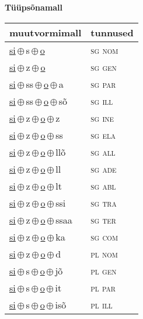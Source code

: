 

\vspace{3.5em}
\noindent \begin{minipage}{\textwidth}
\noindent \textbf{Tüüpsõnamall \,}\\

\begin{sideways}
\begin{tabular}{l l}
muutvormimall & tunnused \\
\hline
\underline{si}\,$\oplus$\,s\,$\oplus$\,\underline{o} & \textsc{ sg nom } \\
\underline{si}\,$\oplus$\,z\,$\oplus$\,\underline{o} & \textsc{ sg gen } \\
\underline{si}\,$\oplus$\,ss\,$\oplus$\,\underline{o}\,$\oplus$\,a & \textsc{ sg par } \\
\underline{si}\,$\oplus$\,ss\,$\oplus$\,\underline{o}\,$\oplus$\,sõ & \textsc{ sg ill } \\
\underline{si}\,$\oplus$\,z\,$\oplus$\,\underline{o}\,$\oplus$\,z & \textsc{ sg ine } \\
\underline{si}\,$\oplus$\,z\,$\oplus$\,\underline{o}\,$\oplus$\,ss & \textsc{ sg ela } \\
\underline{si}\,$\oplus$\,z\,$\oplus$\,\underline{o}\,$\oplus$\,llõ & \textsc{ sg all } \\
\underline{si}\,$\oplus$\,z\,$\oplus$\,\underline{o}\,$\oplus$\,ll & \textsc{ sg ade } \\
\underline{si}\,$\oplus$\,z\,$\oplus$\,\underline{o}\,$\oplus$\,lt & \textsc{ sg abl } \\
\underline{si}\,$\oplus$\,z\,$\oplus$\,\underline{o}\,$\oplus$\,ssi & \textsc{ sg tra } \\
\underline{si}\,$\oplus$\,z\,$\oplus$\,\underline{o}\,$\oplus$\,ssaa & \textsc{ sg ter } \\
\underline{si}\,$\oplus$\,z\,$\oplus$\,\underline{o}\,$\oplus$\,ka & \textsc{ sg com } \\
\underline{si}\,$\oplus$\,z\,$\oplus$\,\underline{o}\,$\oplus$\,d & \textsc{ pl nom } \\
\underline{si}\,$\oplus$\,s\,$\oplus$\,\underline{o}\,$\oplus$\,jõ & \textsc{ pl gen } \\
\underline{si}\,$\oplus$\,s\,$\oplus$\,\underline{o}\,$\oplus$\,it & \textsc{ pl par } \\
\underline{si}\,$\oplus$\,s\,$\oplus$\,\underline{o}\,$\oplus$\,isõ & \textsc{ pl ill } \\

\end{tabular}
\end{sideways}
\end{minipage}
